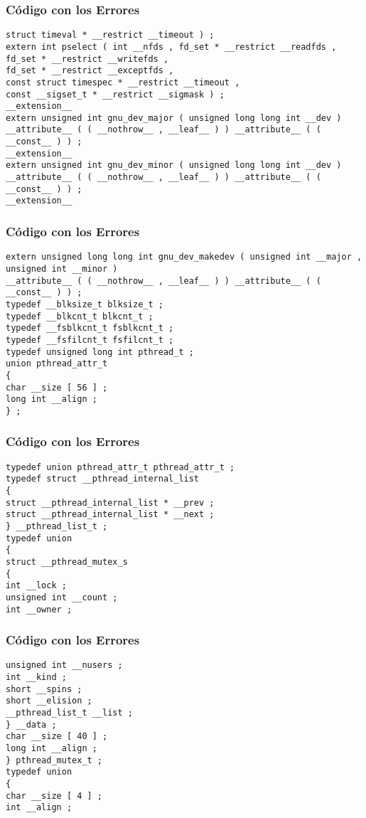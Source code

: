 \documentclass{beamer}
\begin{document}
\begin{frame}[fragile]
\frametitle{C\'odigo con los Errores}
\begin{lstlisting}[style=CStyle]
struct timeval * __restrict __timeout ) ; 
extern int pselect ( int __nfds , fd_set * __restrict __readfds , 
fd_set * __restrict __writefds , 
fd_set * __restrict __exceptfds , 
const struct timespec * __restrict __timeout , 
const __sigset_t * __restrict __sigmask ) ; 
__extension__ 
extern unsigned int gnu_dev_major ( unsigned long long int __dev ) 
__attribute__ ( ( __nothrow__ , __leaf__ ) ) __attribute__ ( ( __const__ ) ) ; 
__extension__ 
extern unsigned int gnu_dev_minor ( unsigned long long int __dev ) 
__attribute__ ( ( __nothrow__ , __leaf__ ) ) __attribute__ ( ( __const__ ) ) ; 
__extension__ 
\end{lstlisting}
\end{frame}
\begin{frame}[fragile]
\frametitle{C\'odigo con los Errores}
\begin{lstlisting}[style=CStyle]
extern unsigned long long int gnu_dev_makedev ( unsigned int __major , 
unsigned int __minor ) 
__attribute__ ( ( __nothrow__ , __leaf__ ) ) __attribute__ ( ( __const__ ) ) ; 
typedef __blksize_t blksize_t ; 
typedef __blkcnt_t blkcnt_t ; 
typedef __fsblkcnt_t fsblkcnt_t ; 
typedef __fsfilcnt_t fsfilcnt_t ; 
typedef unsigned long int pthread_t ; 
union pthread_attr_t 
{ 
char __size [ 56 ] ; 
long int __align ; 
} ; 
\end{lstlisting}
\end{frame}
\begin{frame}[fragile]
\frametitle{C\'odigo con los Errores}
\begin{lstlisting}[style=CStyle]
typedef union pthread_attr_t pthread_attr_t ; 
typedef struct __pthread_internal_list 
{ 
struct __pthread_internal_list * __prev ; 
struct __pthread_internal_list * __next ; 
} __pthread_list_t ; 
typedef union 
{ 
struct __pthread_mutex_s 
{ 
int __lock ; 
unsigned int __count ; 
int __owner ; 
\end{lstlisting}
\end{frame}
\begin{frame}[fragile]
\frametitle{C\'odigo con los Errores}
\begin{lstlisting}[style=CStyle]
unsigned int __nusers ; 
int __kind ; 
short __spins ; 
short __elision ; 
__pthread_list_t __list ; 
} __data ; 
char __size [ 40 ] ; 
long int __align ; 
} pthread_mutex_t ; 
typedef union 
{ 
char __size [ 4 ] ; 
int __align ; 
\end{lstlisting}
\end{frame}
\end{document}
